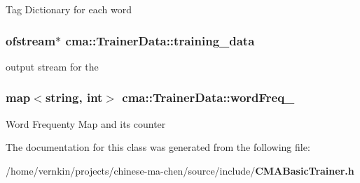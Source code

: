 Tag Dictionary for each word 
\subsubsection[{training\_\-data}]{\setlength{\rightskip}{0pt plus 5cm}ofstream$\ast$ {\bf cma::TrainerData::training\_\-data}}\label{classcma_1_1TrainerData_beca151a5af14873ecd25be4ff926d24}


output stream for the 
\subsubsection[{wordFreq\_\-}]{\setlength{\rightskip}{0pt plus 5cm}map$<$string, int$>$ {\bf cma::TrainerData::wordFreq\_\-}}\label{classcma_1_1TrainerData_1d9d4c16f23c5885d8dfa8c4989be181}


Word Frequenty Map and its counter 

The documentation for this class was generated from the following file:\begin{CompactItemize}
\item 
/home/vernkin/projects/chinese-ma-chen/source/include/{\bf CMABasicTrainer.h}\end{CompactItemize}
